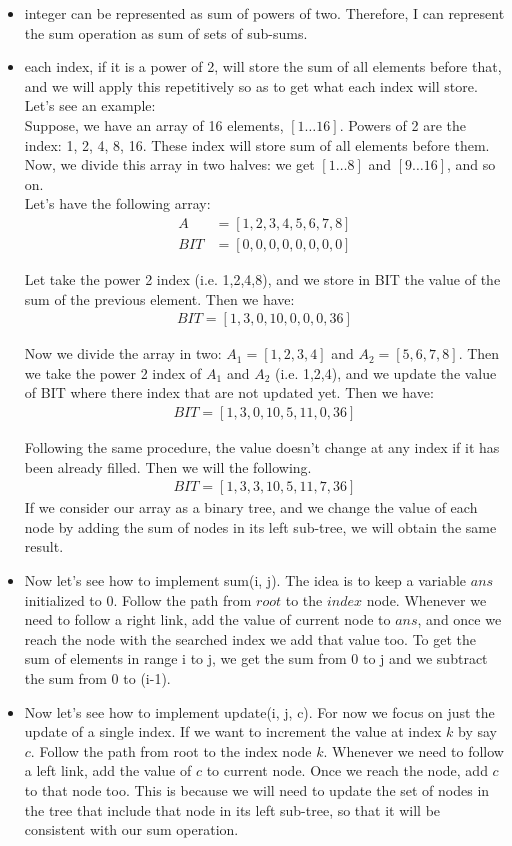 \documentclass[a4paper]{article}
\begin{document}
\begin{itemize}
\item integer can be represented as sum of powers of two. Therefore, I can represent the sum operation as sum of sets of sub-sums.
\item each index, if it is a power of 2, will store the sum of all elements before that, and we will apply this repetitively so as to get what each index will store. Let's see an example:
\\ 
Suppose, we have an array of 16 elements, $[1 \dots 16]$. Powers of 2 are the index: 1, 2, 4, 8, 16. These index will store sum of all elements before them. Now, we divide this array in two halves: we get $[1 \dots 8]$ and $[9 \dots 16]$, and so on. \\
Let's have the following array: 
\begin{align}
\nonumber
A  &=[1,2,3,4,5,6,7,8]\\
BIT&=[0,0,0,0,0,0,0,0]
\end{align}

Let take the power 2 index (i.e. 1,2,4,8), and we store in BIT the value of the sum of the previous element. Then we have:
\begin{align}
\nonumber
BIT=[1,3,0,10,0,0,0,36]
\end{align}

Now we divide the array in two: $A_1=[1,2,3,4]$ and $A_2=[5,6,7,8]$. Then we take the power 2 index of $A_1$ and $A_2$ (i.e. 1,2,4), and we update the value of BIT where there index that are not updated yet. Then we have:
\begin{align}
\nonumber
BIT=[1,3,0,10,5,11,0,36]
\end{align}

Following the same procedure, the value doesn't change at any index if it has been already filled. Then we will the following. 
\begin{align}
\nonumber
BIT=[1,3,3,10,5,11,7,36]
\end{align}
If we consider our array as a binary tree, and we change the value of each node by adding the sum of nodes in its left sub-tree, we will obtain the same result.
\item Now let's see how to implement sum(i, j). The idea is to keep a variable $ans$ initialized to 0. Follow the path from $root$ to the $index$ node. Whenever we need to follow a right link, add the value of current node to $ans$, and once we reach the node with the searched index we add that value too. To get the sum of elements in range i to j,  we get the sum from 0 to j and we subtract the sum from 0 to (i-1). 
\item Now let's see how to implement update(i, j, c). For now we focus on just the update of a single index. If we want to increment the value at index $k$ by say $c$. Follow the path from root to the index node $k$. Whenever we need to follow a left link, add the value of $c$ to current node. Once we reach the node, add $c$ to that node too. This is because we will need to update the set of nodes in the tree that include that node in its left sub-tree, so that it will be consistent with our sum operation.
\end{itemize}
\end{document}
